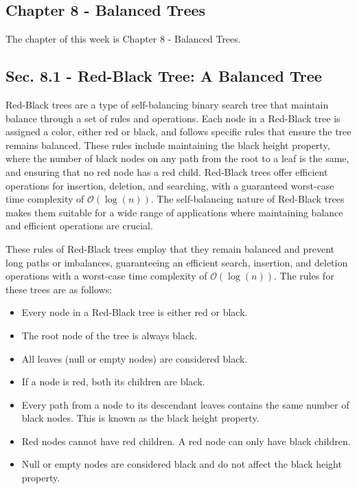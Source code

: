 \subsection{Chapter 8 - Balanced Trees}

The chapter of this week is Chapter 8 - Balanced Trees.

\subsection*{Sec. 8.1 - Red-Black Tree: A Balanced Tree}

Red-Black trees are a type of self-balancing binary search tree that maintain balance through a set of rules and operations. Each node in a Red-Black tree is assigned a color, either red or black, and follows specific rules that ensure the tree remains balanced. These rules include maintaining the black height property, where the number of black 
nodes on any path from the root to a leaf is the same, and ensuring that no red node has a red child. Red-Black trees offer efficient operations for insertion, deletion, and searching, with a guaranteed worst-case time complexity of $\mathcal{O}(\log{(n)})$. The self-balancing nature of Red-Black trees makes them suitable for a wide range of applications where 
maintaining balance and efficient operations are crucial.

These rules of Red-Black trees employ that they remain balanced and prevent long paths or imbalances, guaranteeing an efficient search, insertion, and deletion operations with a worst-case time complexity of $\mathcal{O}(\log{(n)})$. The rules for these trees are as follows:

\begin{itemize}
    \item Every node in a Red-Black tree is either red or black.
    \item The root node of the tree is always black.
    \item All leaves (null or empty nodes) are considered black.
    \item If a node is red, both its children are black.
    \item Every path from a node to its descendant leaves contains the same number of black nodes. This is known as the black height property.
    \item Red nodes cannot have red children. A red node can only have black children.
    \item Null or empty nodes are considered black and do not affect the black height property.
\end{itemize}

